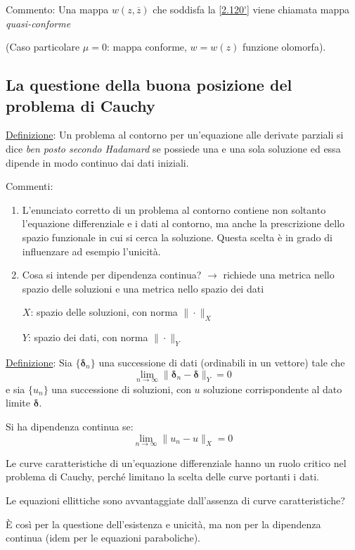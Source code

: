 \documentclass[a4paper,11pt]{report}
\newcommand{\vect}[1]{\boldsymbol{#1}}
\begin{document}
Commento: Una mappa $w(z,\overline{z})$ che soddisfa la \eqref{2.120'} viene chiamata mappa \emph{quasi-conforme}

(Caso particolare $\mu=0$: mappa conforme, $w=w(z)$ funzione olomorfa).

\subsection{La questione della buona posizione del problema di Cauchy}

\underline{Definizione}: Un problema al contorno per un'equazione alle derivate parziali si dice \emph{ben posto secondo Hadamard} se possiede una e una sola soluzione ed essa dipende in modo continuo dai dati iniziali.

\medskip

Commenti:
\begin{enumerate}[label=(\roman*)]
\item L'enunciato corretto di un problema al contorno contiene non soltanto l'equazione differenziale e i dati al contorno, ma anche la prescrizione dello spazio funzionale in cui si cerca la soluzione. Questa scelta \`e in grado di influenzare ad esempio l'unicit\`a.

\item Cosa si intende per dipendenza continua? $\rightarrow$ richiede una metrica nello spazio delle soluzioni e una metrica nello spazio dei dati

$X$: spazio delle soluzioni, con norma $\| \cdot \|_X$

$Y$: spazio dei dati, con norma $\| \cdot \|_Y$
\end{enumerate}

\underline{Definizione}: Sia $\{\vect{\delta}_n\}$ una successione di dati (ordinabili in un vettore) tale che 
\[
\lim_{n\to\infty} \| \vect{\delta}_n - \vect{\delta}\|_Y=0
\]
e sia $\{u_n\}$ una successione di soluzioni, con $u$ soluzione corrispondente al dato limite $\vect{\delta}$.

Si ha dipendenza continua se:
\[
\lim_{n\to \infty}\|u_n - u \|_X=0
\]

Le curve caratteristiche di un'equazione differenziale hanno un ruolo critico nel problema di Cauchy, perch\'e limitano la scelta delle curve portanti i dati.

Le equazioni ellittiche sono avvantaggiate dall'assenza di curve caratteristiche?

\`E cos\`i per la questione dell'esistenza e unicit\`a, ma non per la dipendenza continua (idem per le equazioni paraboliche).
\end{document}
